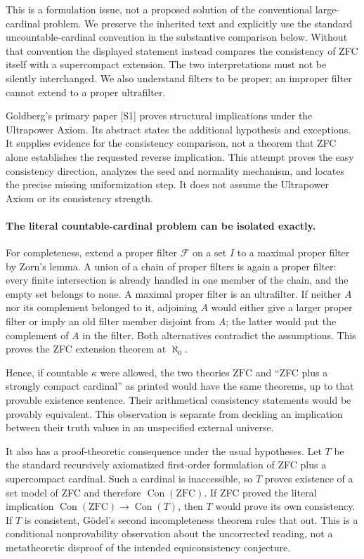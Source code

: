 \documentclass[11pt]{article}
\begin{document}
This is a formulation issue, not a proposed solution of the conventional
large-cardinal problem. We preserve the inherited text and explicitly
use the standard uncountable-cardinal convention in the substantive
comparison below. Without that convention the displayed statement
instead compares the consistency of ZFC itself with a supercompact
extension. The two interpretations must not be silently interchanged.
We also understand filters to be proper; an improper filter cannot
extend to a proper ultrafilter.

Goldberg's primary paper [S1] proves structural implications under the
Ultrapower Axiom. Its abstract states the additional hypothesis and
exceptions. It supplies evidence for the consistency comparison, not
a theorem that ZFC alone establishes the requested reverse implication.
This attempt proves the easy consistency direction, analyzes the seed
and normality mechanism, and locates the precise missing uniformization
step. It does not assume the Ultrapower Axiom or its consistency strength.

\paragraph{The literal countable-cardinal problem can be isolated exactly.}
For completeness, extend a proper filter $\mathcal F$ on a set $I$
to a maximal proper filter by Zorn's lemma. A union of a chain of proper
filters is again a proper filter: every finite intersection is already
handled in one member of the chain, and the empty set belongs to none.
A maximal proper filter is an ultrafilter. If neither $A$ nor its
complement belonged to it, adjoining $A$ would either give a larger
proper filter or imply an old filter member disjoint from $A$; the
latter would put the complement of $A$ in the filter. Both alternatives
contradict the assumptions. This proves the ZFC extension theorem at
$\aleph_0$.

Hence, if countable $\kappa$ were allowed, the two theories
$\mathrm{ZFC}$ and ``ZFC plus a strongly compact cardinal'' as printed
would have the same theorems, up to that provable existence sentence.
Their arithmetical consistency statements would be provably equivalent.
This observation is separate from deciding an implication between their
truth values in an unspecified external universe.

It also has a proof-theoretic consequence under the usual hypotheses.
Let $T$ be the standard recursively axiomatized first-order formulation
of ZFC plus a supercompact cardinal. Such a cardinal is inaccessible,
so $T$ proves existence of a set model of ZFC and therefore
$\operatorname{Con}(\mathrm{ZFC})$. If ZFC proved the literal implication
$\operatorname{Con}(\mathrm{ZFC})\to\operatorname{Con}(T)$, then
$T$ would prove its own consistency. If $T$ is consistent, Gödel's
second incompleteness theorem rules that out. This is a conditional
nonprovability observation about the uncorrected reading, not a
metatheoretic disproof of the intended equiconsistency conjecture.
\end{document}
